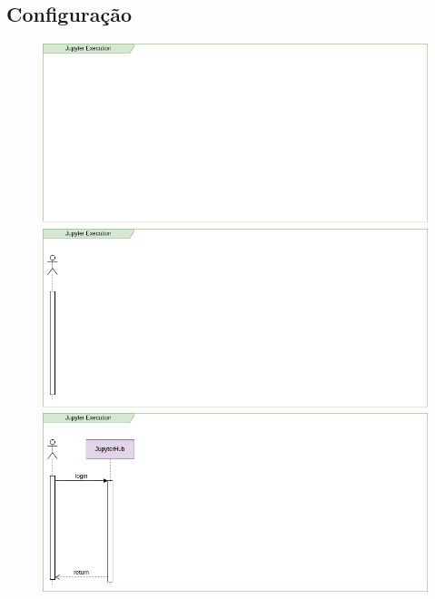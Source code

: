 \documentclass[10pt,brazil]{beamer}
\theoremstyle{definition}
\begin{document}
\subsection{Configuração}

\begin{frame}[plain]
  \hspace*{-10mm}
    \begin{figure}
      \begin{center}
        \begin{overprint}
          \includegraphics[width=1\textwidth]{seq-jupy-1.png}
          \includegraphics[width=1\textwidth]{seq-jupy-2.png}
          \includegraphics[width=1\textwidth]{seq-jupy-3.png}

\end{overprint}
\end{center}
\end{figure}
\end{frame}
\end{document}
